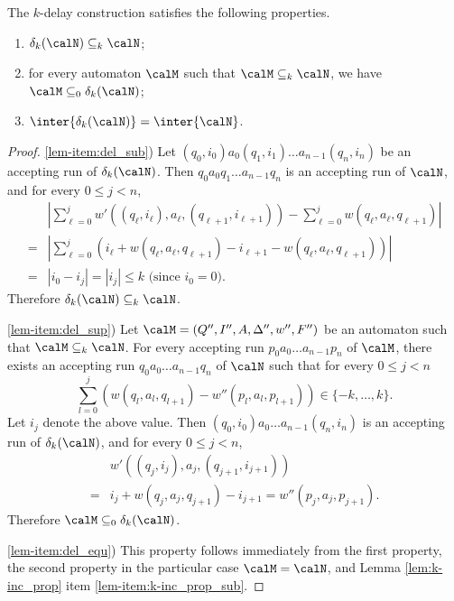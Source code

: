 \documentclass[a4paper]{article}
\begin{document}
\begin{lemma}\label{lem:delay-construction}
	The $k$-delay construction satisfies the following properties.
	\begin{enumerate}[nolistsep]
		\item \label{lem-item:del_sub} $\delta_k(\calN) \subseteq_k
			\calN$;
		\item \label{lem-item:del_sup} for every automaton
			$\calM$ such that $\calM \subseteq_{k}
			\calN$, we have $\calM \subseteq_0 \delta_k(\calN)$;
		\item \label{lem-item:del_equ} $\inter{\delta_k(\calN)} =
			\inter{\calN}$.
	\end{enumerate}
\end{lemma}
\begin{proof}
	\item \ref{lem-item:del_sub})
	Let
	$(q_0,i_0) a_0 (q_1,i_1) \dots a_{n-1}(q_n,i_n)$
	be an accepting run of $\delta_k(\calN)$.  Then
	$q_0 a_0 q_1 \dots a_{n-1} q_n$ is an accepting run of $\calN$,
	and for every $0 \leq j < n$,
	\begin{align*}
		& \textstyle \left|\sum_{\ell = 0}^{j}
			w'((q_{\ell},i_{\ell}),a_\ell,(q_{\ell+1},i_{\ell+1})) - \sum_{\ell =
			0}^{j} w(q_{\ell},a_\ell,q_{\ell+1})\right|\\
		= & \textstyle \left|\sum_{\ell = 0}^{j} (i_{\ell} + w(q_{\ell},a_\ell,q_{\ell+1})
			-i_{\ell+1} -w(q_{\ell},a_\ell,q_{\ell+1}))\right|\\
		= & |i_0 - i_j| = |i_j| \leq k \text{ (since $i_0 = 0$).}
	\end{align*}
	Therefore $\delta_k(\calN) \subseteq_k \calN$.

	\item \ref{lem-item:del_sup})
	Let $\calM =  (Q'', I'', A, \Delta'', w'',F'')$ be an
	automaton such that $\calM \subseteq_{k} \calN$.  For every
	accepting run $p_0a_0 \dots a_{n-1} p_n$ of
	$\calM$, there exists an accepting run
	$q_0 a_0 \dots a_{n-1} q_n$ of $\calN$ such that for
	every $0 \leq j < n$ 	
	\[ \textstyle
		\sum_{l = 0}^j \left(w(q_{l},a_l,q_{l+1}) - 
		w''(p_{l},a_l,p_{l+1})\right) \in \{ -k, \dots, k \}.
	\]
	Let $i_j$ denote the above value.
	Then
	$(q_0,i_0)a_0 \dots a_{n-1} (q_n,i_n)$
	is an accepting 
	run of $\delta_k(\calN)$, and for every $0 \leq j < n$, 
	\begin{align*}
		& w'((q_{j},i_{j}),a_j,(q_{j+1},i_{j+1})) \\
		{ }={ } & i_{j} + w(q_{j},a_j,q_{j+1}) - i_{j+1}
		= w''(p_{j},a_j,p_{j+1}).
	\end{align*}
	Therefore $\calM \subseteq_0 \delta_k(\calN)$.

	\item \ref{lem-item:del_equ})
	This property follows immediately from the first property, the second
	property in the particular case $\calM = \calN$, and Lemma
	\ref{lem:k-inc_prop} item \ref{lem-item:k-inc_prop_sub}.
\end{proof}
\end{document}
